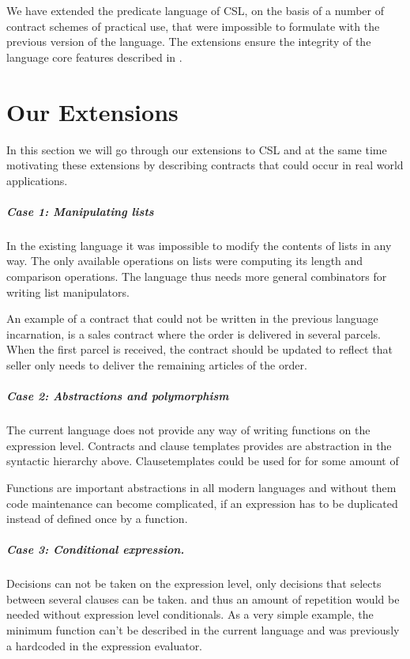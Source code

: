 \documentclass[10pt,a4paper,final,oneside,openany,article]{memoir}
\begin{document}
We have extended the predicate language of CSL, on the basis of a
number of contract schemes of practical use, that were impossible to
formulate with the previous version of the language. The extensions
ensure the integrity of the language core features described in
\cite{hvitved10}. %


\chapter{Our Extensions}
\label{extensions}
In this section we will go through our extensions to CSL and at the
same time motivating these extensions by describing contracts that
could occur in real world applications. 

\paragraph{Case 1: Manipulating lists} In the existing language it was
impossible to modify the contents of lists in any way. The only
available operations on lists were computing its length and comparison
operations. The language thus needs more general combinators for
writing list manipulators.

An example of a contract that could not be written in the previous
language incarnation, is a sales contract where the order is delivered
in several parcels. When the first parcel is received, the contract
should be updated to reflect that seller only needs to deliver the
remaining articles of the order.

\paragraph{Case 2: Abstractions and polymorphism} The current language
does not provide any way of writing functions on the expression
level. Contracts and clause templates provides are abstraction in the
syntactic hierarchy above. Clausetemplates could be used for for some
amount of

Functions are important abstractions in all modern languages and
without them code maintenance can become complicated, if an expression
has to be duplicated instead of defined once by a function.

\paragraph{Case 3: Conditional expression.} Decisions can not be taken
on the expression level, only decisions that selects between several
clauses can be taken. and thus an amount of repetition would be needed
without expression level conditionals. As a very simple example, the
minimum function can't be described in the current language and was
previously a hardcoded in the expression evaluator.
\end{document}
